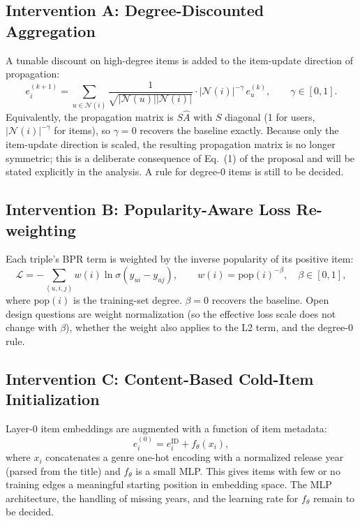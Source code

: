 \documentclass{article}
\begin{document}
\subsection{Intervention A: Degree-Discounted Aggregation}
A tunable discount on high-degree items is added to the item-update direction of propagation:
\begin{equation}
e_i^{(k+1)} = \sum_{u \in \mathcal{N}(i)} \frac{1}{\sqrt{|\mathcal{N}(u)||\mathcal{N}(i)|}} \cdot |\mathcal{N}(i)|^{-\gamma}\, e_u^{(k)}, \qquad \gamma \in [0, 1].
\end{equation}
Equivalently, the propagation matrix is $S\hat{A}$ with $S$ diagonal (1 for users, $|\mathcal{N}(i)|^{-\gamma}$ for items), so $\gamma = 0$ recovers the baseline exactly. Because only the item-update direction is scaled, the resulting propagation matrix is no longer symmetric; this is a deliberate consequence of Eq.~(1) of the proposal and will be stated explicitly in the analysis. A rule for degree-0 items is still to be decided.

\subsection{Intervention B: Popularity-Aware Loss Re-weighting}
Each triple's BPR term is weighted by the inverse popularity of its positive item:
\begin{equation}
\mathcal{L} = -\sum_{(u,i,j)} w(i) \ln \sigma(y_{ui} - y_{uj}), \qquad w(i) = \mathrm{pop}(i)^{-\beta}, \quad \beta \in [0,1],
\end{equation}
where $\mathrm{pop}(i)$ is the training-set degree. $\beta = 0$ recovers the baseline. Open design questions are weight normalization (so the effective loss scale does not change with $\beta$), whether the weight also applies to the L2 term, and the degree-0 rule.

\subsection{Intervention C: Content-Based Cold-Item Initialization}
Layer-0 item embeddings are augmented with a function of item metadata:
\begin{equation}
e_i^{(0)} = e_i^{\mathrm{ID}} + f_\theta(x_i),
\end{equation}
where $x_i$ concatenates a genre one-hot encoding with a normalized release year (parsed from the title) and $f_\theta$ is a small MLP. This gives items with few or no training edges a meaningful starting position in embedding space. The MLP architecture, the handling of missing years, and the learning rate for $f_\theta$ remain to be decided.
\end{document}
